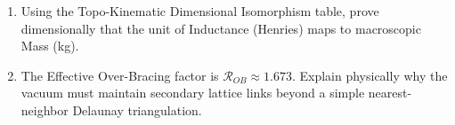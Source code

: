 \begin{exercisebox}
\begin{enumerate}
    \item Using the Topo-Kinematic Dimensional Isomorphism table, prove dimensionally that the unit of Inductance (Henries) maps to macroscopic Mass (kg).
    \item The Effective Over-Bracing factor is $\mathcal{R}_{OB} \approx 1.673$. Explain physically why the vacuum must maintain secondary lattice links beyond a simple nearest-neighbor Delaunay triangulation.
\end{enumerate}
\end{exercisebox}
%
%
